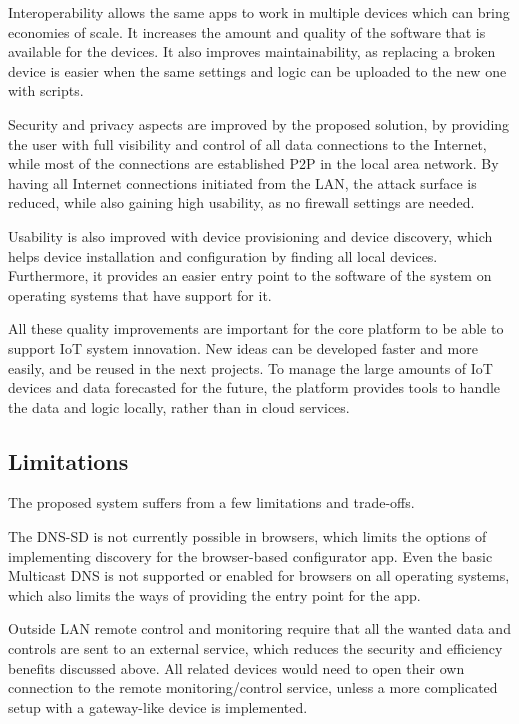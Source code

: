 Interoperability allows the same apps to work in multiple devices which can bring economies of scale. It increases the amount and quality of the software that is available for the devices. It also improves maintainability, as replacing a broken device is easier when the same settings and logic can be uploaded to the new one with scripts. 

Security and privacy aspects are improved by the proposed solution, by providing the user with full visibility and control of all data connections to the Internet, while most of the connections are established P2P in the local area network. By having all Internet connections initiated from the LAN, the attack surface is reduced, while also gaining high usability, as no firewall settings are needed.

Usability is also improved with device provisioning and device discovery, which helps device installation and configuration by finding all local devices. Furthermore, it provides an easier entry point to the software of the system on operating systems that have support for it.

All these quality improvements are important for the core platform to be able to support IoT system innovation. New ideas can be developed faster and more easily, and be reused in the next projects. To manage the large amounts of IoT devices and data forecasted for the future, the platform provides tools to handle the data and logic locally, rather than in cloud services.

\subsection*{Limitations}

The proposed system suffers from a few limitations and trade-offs.

The DNS-SD is not currently possible in browsers, which limits the options of implementing discovery for the browser-based configurator app. Even the basic Multicast DNS is not supported or enabled for browsers on all operating systems, which also limits the ways of providing the entry point for the app. %

Outside LAN remote control and monitoring require that all the wanted data and controls are sent to an external service, which reduces the security and efficiency benefits discussed above. All related devices would need to open their own connection to the remote monitoring/control service, unless a more complicated setup with a gateway-like device is implemented.

